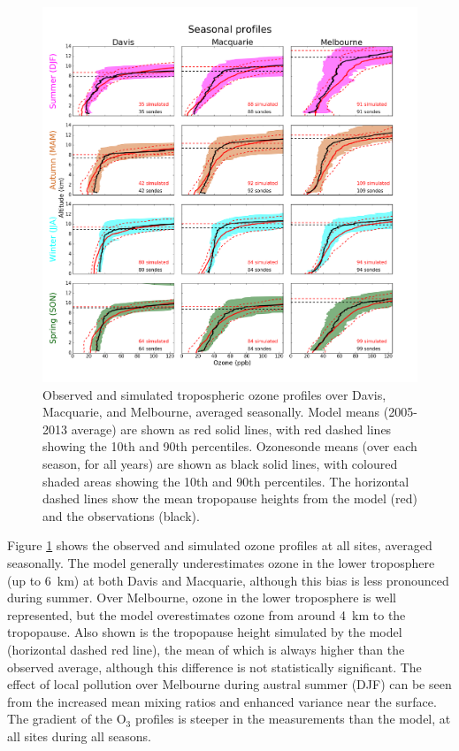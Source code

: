 \documentclass[acp, manuscript]{copernicus} %
\begin{document}
  \begin{figure}[t]
    \includegraphics[width=14.0cm]{figures/seasonalprofiles00.png}
    \caption{%
      Observed and simulated tropospheric ozone profiles over Davis, Macquarie, and Melbourne, averaged seasonally.
      Model means (2005-2013 average) are shown as red solid lines, with red dashed lines showing the 10th and 90th percentiles.
      Ozonesonde means (over each season, for all years) are shown as black solid lines, with coloured shaded areas showing the 10th and 90th percentiles.
      The horizontal dashed lines show the mean tropopause heights from the model (red) and the observations (black).}
    \label{fig:GEOSChemSeasonalProfiles}
  \end{figure}

  Figure \ref{fig:GEOSChemSeasonalProfiles} shows the observed and simulated ozone profiles at all sites, averaged seasonally.
  The model generally underestimates ozone in the lower troposphere (up to 6~km) at both Davis and Macquarie, although this bias is less pronounced during summer.
  Over Melbourne, ozone in the lower troposphere is well represented, but the model overestimates ozone from around 4~km to the tropopause.
  Also shown is the tropopause height simulated by the model (horizontal dashed red line), the mean of which is always higher than the observed average, although this difference is not statistically significant.
  The effect of local pollution over Melbourne during austral summer (DJF) can be seen from the increased mean mixing ratios and enhanced variance near the surface.
  The gradient of the O$_3$ profiles is steeper in the measurements than the model, at all sites during all seasons.
\end{document}
